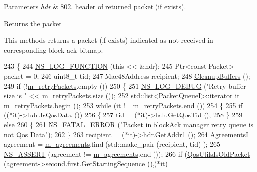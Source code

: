 \begin{DoxyParams}{Parameters}
{\em hdr} & 802. header of returned packet (if exists).\\
\hline
\end{DoxyParams}
\begin{DoxyReturn}{Returns}
the packet
\end{DoxyReturn}
This methods returns a packet (if exists) indicated as not received in corresponding block ack bitmap. 
\begin{DoxyCode}
243 \{
244   \hyperlink{log-macros-disabled_8h_a90b90d5bad1f39cb1b64923ea94c0761}{NS\_LOG\_FUNCTION} (\textcolor{keyword}{this} << &hdr);
245   Ptr<const Packet> packet = 0;
246   uint8\_t tid;
247   Mac48Address recipient;
248   \hyperlink{classns3_1_1BlockAckManager_a27603e1b5ff9a9f5922b1056c75733e1}{CleanupBuffers} ();
249   \textcolor{keywordflow}{if} (!\hyperlink{classns3_1_1BlockAckManager_a2851f947dd68945ebc25961cff893ed9}{m\_retryPackets}.empty ())
250     \{
251       \hyperlink{group__logging_ga413f1886406d49f59a6a0a89b77b4d0a}{NS\_LOG\_DEBUG} (\textcolor{stringliteral}{"Retry buffer size is "} << \hyperlink{classns3_1_1BlockAckManager_a2851f947dd68945ebc25961cff893ed9}{m\_retryPackets}.size ());
252       std::list<PacketQueueI>::iterator it = \hyperlink{classns3_1_1BlockAckManager_a2851f947dd68945ebc25961cff893ed9}{m\_retryPackets}.begin ();
253       \textcolor{keywordflow}{while} (it != \hyperlink{classns3_1_1BlockAckManager_a2851f947dd68945ebc25961cff893ed9}{m\_retryPackets}.end ())
254         \{
255           \textcolor{keywordflow}{if} ((*it)->hdr.IsQosData ())
256             \{
257               tid = (*it)->hdr.GetQosTid ();
258             \}
259           \textcolor{keywordflow}{else}
260             \{
261               \hyperlink{group__fatal_ga5131d5e3f75d7d4cbfd706ac456fdc85}{NS\_FATAL\_ERROR} (\textcolor{stringliteral}{"Packet in blockAck manager retry queue is not Qos Data"});
262             \}
263           recipient = (*it)->hdr.GetAddr1 ();
264           \hyperlink{classns3_1_1BlockAckManager_acbd1cf7c5f3487150955c3a4c9d04102}{AgreementsI} agreement = \hyperlink{classns3_1_1BlockAckManager_a952a6b8b29705c83ba6464f7cf7ffe66}{m\_agreements}.find (std::make\_pair (recipient, tid)
      );
265           \hyperlink{assert_8h_a6dccdb0de9b252f60088ce281c49d052}{NS\_ASSERT} (agreement != \hyperlink{classns3_1_1BlockAckManager_a952a6b8b29705c83ba6464f7cf7ffe66}{m\_agreements}.end ());
266           \textcolor{keywordflow}{if} (\hyperlink{group__wifi_ga5cb9ea723837c5a036e622612f2d0bb0}{QosUtilsIsOldPacket} (agreement->second.first.GetStartingSequence (),(*it)

\end{DoxyCode}
